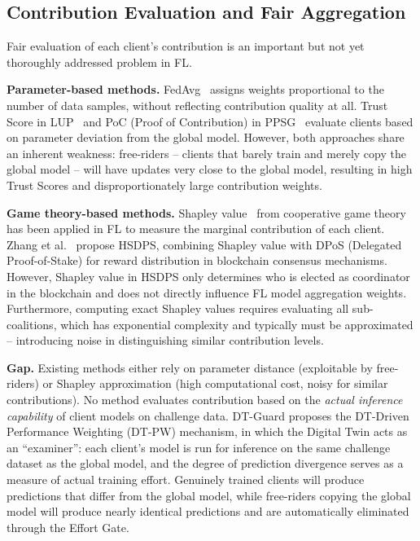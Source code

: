 \documentclass[runningheads]{llncs}
\begin{document}
\subsection{Contribution Evaluation and Fair Aggregation}

Fair evaluation of each client's contribution is an important but not yet thoroughly addressed problem in FL.

\textbf{Parameter-based methods.} FedAvg~\cite{mcmahan2016communication} assigns weights proportional to the number of data samples, without reflecting contribution quality at all. Trust Score in LUP~\cite{issa2025dtbfl} and PoC (Proof of Contribution) in PPSG~\cite{zhang2025ppsg} evaluate clients based on parameter deviation from the global model. However, both approaches share an inherent weakness: free-riders -- clients that barely train and merely copy the global model -- will have updates very close to the global model, resulting in high Trust Scores and disproportionately large contribution weights.

\textbf{Game theory-based methods.} Shapley value~\cite{shapley1953value} from cooperative game theory has been applied in FL to measure the marginal contribution of each client. Zhang et al.~\cite{zhang2025bcsm} propose HSDPS, combining Shapley value with DPoS (Delegated Proof-of-Stake) for reward distribution in blockchain consensus mechanisms. However, Shapley value in HSDPS only determines who is elected as coordinator in the blockchain and does not directly influence FL model aggregation weights. Furthermore, computing exact Shapley values requires evaluating all sub-coalitions, which has exponential complexity and typically must be approximated -- introducing noise in distinguishing similar contribution levels.

\textbf{Gap.} Existing methods either rely on parameter distance (exploitable by free-riders) or Shapley approximation (high computational cost, noisy for similar contributions). No method evaluates contribution based on the \emph{actual inference capability} of client models on challenge data. DT-Guard proposes the DT-Driven Performance Weighting (DT-PW) mechanism, in which the Digital Twin acts as an ``examiner'': each client's model is run for inference on the same challenge dataset as the global model, and the degree of prediction divergence serves as a measure of actual training effort. Genuinely trained clients will produce predictions that differ from the global model, while free-riders copying the global model will produce nearly identical predictions and are automatically eliminated through the Effort Gate.
\end{document}

